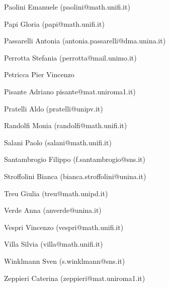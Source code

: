 \documentclass[12pt]{article}
\begin{document}
Paolini Emanuele (paolini@math.unifi.it)

Papi Gloria (papi@math.unifi.it)

Passarelli Antonia (antonia.passarelli@dma.unina.it)

Perrotta Stefania (perrotta@mail.unimo.it)

Petricca Pier Vincenzo  

Pisante Adriano pisante@mat.uniroma1.it)

Pratelli Aldo (pratelli@unipv.it)

Randolfi Monia (randolfi@math.unifi.it)

Salani Paolo (salani@math.unifi.it)

Santambrogio Filippo (f.santambrogio@sns.it)

Stroffolini Bianca (bianca.stroffolini@unina.it)

Treu Giulia (treu@math.unipd.it)

Verde Anna (anverde@unina.it)

Vespri Vincenzo (vespri@math.unifi.it)

Villa Silvia (villa@math.unifi.it)

Winklmann Sven (s.winklmann@sns.it)

Zeppieri Caterina (zeppieri@mat.uniroma1.it)

 
\end{document}
